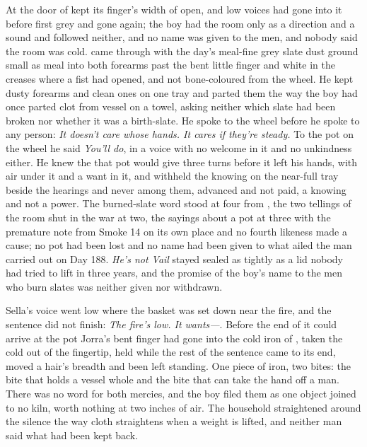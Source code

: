 At  the door of  kept its finger's width of open, and low voices had gone into it before first grey and gone again; the boy had the room only as a direction and a sound and followed neither, and no name was given to the men, and nobody said the room was cold.  came through with the day's meal-fine grey slate dust ground small as meal into both forearms past the bent little finger and white in the creases where a fist had opened, and not bone-coloured  from the wheel. He kept dusty forearms and clean ones on one tray and parted them the way the boy had once parted clot from vessel on a towel, asking neither which slate had been broken nor whether it was a birth-slate. He spoke to the wheel before he spoke to any person: \emph{It doesn't care whose hands. It cares if they're steady.} To the pot on the wheel he said \emph{You'll do}, in a voice with no welcome in it and no unkindness either. He knew the  that pot would give three turns before it left his hands, with air under it and a want in it, and withheld the knowing on the near-full tray beside the hearings and never among them, advanced and not paid, a knowing and not a power. The burned-slate word stood at four from , the two tellings of the room shut in the war at two, the sayings about a pot at three with the premature note from Smoke 14 on its own place and no fourth likeness made a cause; no pot had been lost and no name had been given to what ailed the man carried out on Day 188. \emph{He's not Vail} stayed sealed as tightly as a lid nobody had tried to lift in three years, and the promise of the boy's name to the men who burn slates was neither given nor withdrawn.

Sella's voice went low where the basket was set down near the fire, and the sentence did not finish: \emph{The fire's low. It wants---}. Before the end of it could arrive at the pot Jorra's bent finger had gone into the cold iron of , taken the cold out of the fingertip, held while the rest of the sentence came to its end, moved a hair's breadth and been left standing. One piece of iron, two bites: the bite that holds a vessel whole and the bite that can take the hand off a man. There was no  word for both mercies, and the boy filed them as one object joined to no kiln, worth nothing at two inches of air. The household straightened around the silence the way cloth straightens when a weight is lifted, and neither man said what had been kept back.

